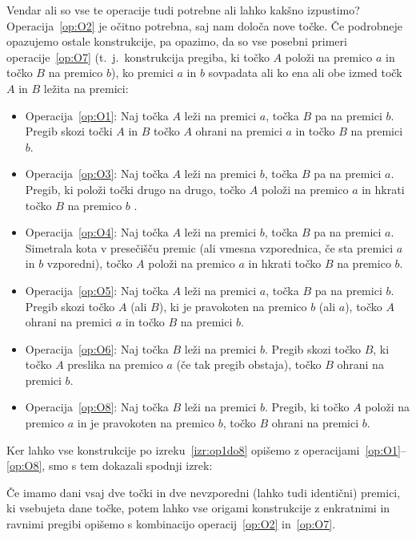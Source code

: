 Vendar ali so vse te operacije tudi potrebne ali lahko kakšno izpustimo? Operacija~\ref{op:O2} je očitno potrebna, saj nam določa nove točke. Če podrobneje opazujemo ostale konstrukcije, pa opazimo, da so vse posebni primeri operacije~\ref{op:O7} (t.\ j.\ konstrukcija pregiba, ki točko $A$ položi na premico $a$ in točko $B$ na premico $b$), ko premici $a$ in $b$ sovpadata ali ko ena ali obe izmed točk $A$ in $B$ ležita na premici:
\begin{itemize}
    \item Operacija~\ref{op:O1}: Naj točka $A$ leži na premici $a$, točka $B$ pa na premici $b$. Pregib skozi točki $A$ in $B$ točko $A$ ohrani na premici $a$ in točko $B$ na premici $b$.
    \item Operacija~\ref{op:O3}: Naj točka $A$ leži na premici $b$, točka $B$ pa na premici $a$. Pregib, ki položi točki drugo na drugo, točko $A$ položi na premico $a$ in hkrati točko $B$ na premico $b$ .
    \item Operacija~\ref{op:O4}: Naj točka $A$ leži na premici $b$, točka $B$ pa na premici $a$. Simetrala kota v presečišču premic (ali vmesna vzporednica, če sta premici $a$ in $b$ vzporedni), točko $A$ položi na premico $a$ in hkrati točko $B$ na premico $b$.
    \item Operacija~\ref{op:O5}: Naj točka $A$ leži na premici $a$, točka $B$ pa na premici $b$. Pregib skozi točko $A$ (ali $B$), ki je pravokoten na premico $b$ (ali $a$), točko $A$ ohrani na premici $a$ in točko $B$ na premici $b$.
    \item Operacija~\ref{op:O6}: Naj točka $B$ leži na premici $b$. Pregib skozi točko $B$, ki točko $A$ preslika na premico $a$ (če tak pregib obstaja), točko $B$ ohrani na premici $b$.
    \item Operacija~\ref{op:O8}: Naj točka $B$ leži na premici $b$. Pregib, ki točko $A$ položi na premico $a$ in je pravokoten na premico $b$, točko $B$ ohrani na premici $b$.
\end{itemize}

Ker lahko vse konstrukcije po izreku~\ref{izr:op1do8} opišemo z operacijami~\ref{op:O1}--\ref{op:O8}, smo s tem dokazali spodnji izrek:

\begin{izrek}
    \label{izr:dve_operaciji}
    Če imamo dani vsaj dve točki in dve nevzporedni (lahko tudi identični) premici, ki vsebujeta dane točke, potem lahko vse origami konstrukcije z enkratnimi in ravnimi pregibi opišemo s kombinacijo operacij~\ref{op:O2} in~\ref{op:O7}.
\end{izrek}

